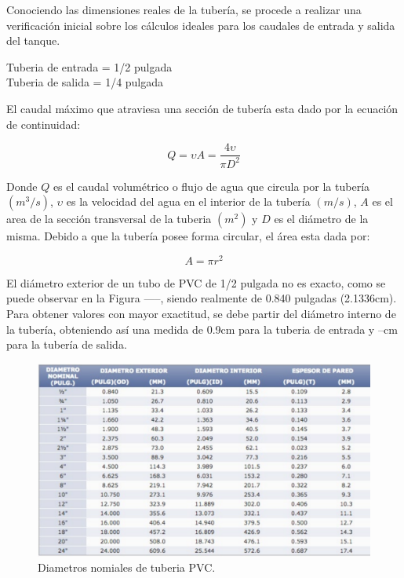 \documentclass[a4paper,12pt,twoside]{proyectotanquesecci}
\begin{document}
Conociendo las dimensiones reales de la tubería, se procede a realizar una verificación inicial sobre los cálculos ideales para los caudales de entrada y salida del tanque.

\begin{center}
Tuberia de entrada = 1/2 pulgada \\
Tuberia de salida = 1/4 pulgada
\end{center}

El caudal máximo que atraviesa una sección de tubería esta dado por la ecuación de continuidad:

\begin{equation}
Q=\upsilon A=\frac{4\upsilon}{\pi D^{2}}
\end{equation}

Donde $Q$ es el caudal volumétrico o flujo de agua que circula por la tubería $(m^{3}/s)$, $\upsilon$ es la velocidad del agua en el interior de la tubería $(m/s)$, $A$ es el area de la sección transversal de la tuberia $(m^{2})$ y $D$ es el diámetro de la misma. Debido a que la tubería posee forma circular, el área esta dada por:

\begin{equation}
A=\pi r^{2}
\end{equation}

El diámetro exterior de un tubo de PVC de 1/2 pulgada no es exacto, como se puede observar en la Figura -----, siendo realmente de 0.840 pulgadas (2.1336cm). Para obtener valores con mayor exactitud, se debe partir del diámetro interno de la tubería, obteniendo así una medida de 0.9cm para la tuberia de entrada y --cm para la tubería de salida.

\begin{figure}[h]
\centering
\includegraphics[scale=0.5]{DiametrosPVC}
\renewcommand{\figurename}{Fig.}
\caption{Diametros nomiales de tuberia PVC.}
\label{Diametros nomiales de tuberia PVC.}
\end{figure}
\end{document}
